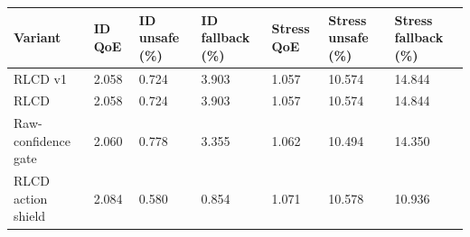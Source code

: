 \begin{tabular}{lllllll}
\toprule
Variant & ID QoE & ID unsafe (\%) & ID fallback (\%) & Stress QoE & Stress unsafe (\%) & Stress fallback (\%) \\
\midrule
RLCD v1 & 2.058 & 0.724 & 3.903 & 1.057 & 10.574 & 14.844 \\
RLCD & 2.058 & 0.724 & 3.903 & 1.057 & 10.574 & 14.844 \\
Raw-confidence gate & 2.060 & 0.778 & 3.355 & 1.062 & 10.494 & 14.350 \\
RLCD action shield & 2.084 & 0.580 & 0.854 & 1.071 & 10.578 & 10.936 \\
\bottomrule
\end{tabular}
